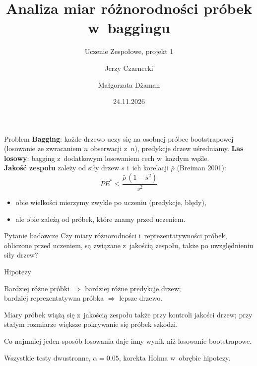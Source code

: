 \documentclass[aspectratio=169,11pt]{beamer}
\title{Analiza miar różnorodności próbek w~baggingu}
\subtitle{Uczenie Zespołowe, projekt 1}
\author{Jerzy Czarnecki \and Małgorzata Dżaman}
\date{24.11.2026}
\institute{Politechnika Warszawska, Wydział MiNI}
\begin{document}
\maketitle

\begin{frame}{Problem}
\small
\textbf{Bagging}: każde drzewo uczy się na osobnej próbce bootstrapowej (losowanie ze zwracaniem $n$ obserwacji z~$n$), predykcje drzew uśredniamy. \textbf{Las losowy}: bagging z~dodatkowym losowaniem cech w~każdym węźle.\\[0.4em]
\normalsize
\textbf{Jakość zespołu} zależy od siły drzew $s$ i~ich korelacji $\bar\rho$ \;(Breiman 2001):
\[
PE^{*} \le \frac{\bar{\rho}\,(1-s^{2})}{s^{2}}
\]
\vspace{-0.5em}
\begin{itemize}
  \item obie wielkości mierzymy zwykle \alert{po} uczeniu (predykcje, błędy),
  \item ale obie zależą od \alert{próbek}, które znamy \alert{przed} uczeniem.
\end{itemize}

\vspace{0.6em}
\begin{block}{Pytanie badawcze}
Czy miary różnorodności i~reprezentatywności próbek, obliczone przed uczeniem, są związane z~jakością zespołu, także po uwzględnieniu siły drzew?
\end{block}
\end{frame}

\begin{frame}{Hipotezy}
\begin{description}[H1]
  \item[H1] Bardziej różne próbki $\Rightarrow$ bardziej różne predykcje drzew;\\ bardziej reprezentatywna próbka $\Rightarrow$ lepsze drzewo.
  \item[H2] Miary próbek wiążą się z~jakością zespołu także przy kontroli jakości drzew; przy stałym rozmiarze większe pokrywanie się próbek szkodzi.
  \item[H3] Co najmniej jeden sposób losowania daje inny wynik niż losowanie bootstrapowe.
\end{description}
\vspace{0.5em}
Wszystkie testy dwustronne, $\alpha = 0.05$, korekta Holma w~obrębie hipotezy.
\end{frame}
\end{document}
